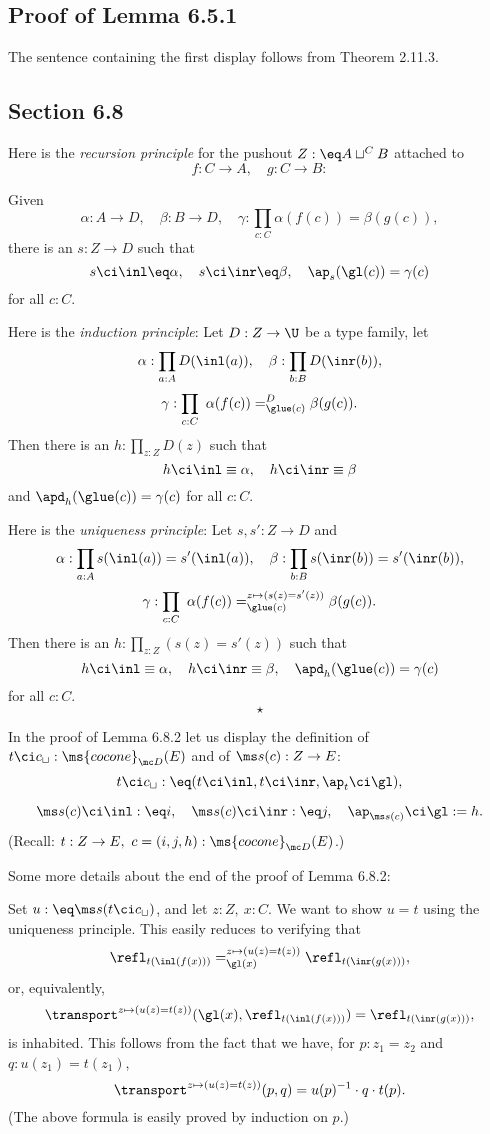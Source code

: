 \documentclass[12pt]{article}
\begin{document}

\subsection{Proof of Lemma 6.5.1}

The sentence containing the first display follows from Theorem 2.11.3.


\subsection{Section 6.8}

Here is the \emph{recursion principle} for the pushout $Z:\eq A\sqcup^CB$ attached to 
$$
f:C\to A,\quad g:C\to B:
$$ 

Given 
$$
\alpha:A\to D,\quad\beta:B\to D,\quad\gamma:\prod_{c:C}\alpha(f(c))=\beta(g(c)),
$$ 
there is an $s:Z\to D$ such that 
$$
s\ci\inl\eq\alpha,\quad s\ci\inr\eq\beta,\quad\ap_s(\gl(c))=\gamma(c)
$$ 
for all $c:C$.

Here is the \emph{induction principle}: Let $D:Z\to\U$ be a type family, let 
$$
\alpha:\prod_{a:A}D(\inl(a)),\quad\beta:\prod_{b:B}D(\inr(b)),
$$
$$
\gamma:\prod_{c:C}\ \alpha(f(c))=^D_{\glue(c)}\beta(g(c)).
$$ 
Then there is an $h:\prod_{z:Z}D(z)$ such that 
$$
h\ci\inl\equiv\alpha,\quad h\ci\inr\equiv\beta
$$ 
and $\apd_h(\glue(c))=\gamma(c)$ for all $c:C$. 

Here is the \emph{uniqueness principle}: Let $s,s':Z\to D$ and 
$$
\alpha:\prod_{a:A}s(\inl(a))=s'(\inl(a)),\quad\beta:\prod_{b:B}s(\inr(b))=s'(\inr(b)),
$$
$$
\gamma:\prod_{c:C}\ \alpha(f(c))=^{z\mapsto(s(z)=s'(z))}_{\glue(c)}\beta(g(c)).
$$ 
Then there is an $h:\prod_{z:Z}(s(z)=s'(z))$ such that 
$$
h\ci\inl\equiv\alpha,\quad h\ci\inr\equiv\beta,\quad\apd_h(\glue(c))=\gamma(c)
$$ 
for all $c:C$. 
$$
\star
$$

In the proof of Lemma 6.8.2 let us display the definition of $t\ci c_{\sqcup}:\ms{cocone}_{\mc D}(E)$ and of $\ms s(c):Z\to E$: 
$$
t\ci c_{\sqcup}:\eq(t\ci\inl,t\ci\inr,\ap_t\ci\gl),
$$ 

$$
\ms s(c)\ci\inl:\eq i,\quad\ms s(c)\ci\inr :\eq j,\quad\ap_{\ms s(c)}\ci\gl:=h.
$$ 
(Recall: $t:Z\to E,\ c=(i,j,h):\ms{cocone}_{\mc D}(E)$.)

Some more details about the end of the proof of Lemma 6.8.2:

Set $u:\eq\ms s(t\ci c_\sqcup)$, and let $z:Z,\ x:C$. We want to show $u=t$ using the uniqueness principle. This easily reduces to verifying that 
$$
\refl_{t(\inl(f(x)))}=_{\gl(x)}^{z\mapsto(u(z)=t(z))}\refl_{t(\inr(g(x)))},
$$ 
or, equivalently, 
$$
\transport^{z\mapsto(u(z)=t(z))}(\gl(x),\refl_{t(\inl(f(x)))})=\refl_{t(\inr(g(x)))},
$$ 
is inhabited. This follows from the fact that we have, for $p:z_1=z_2$ and $q:u(z_1)=t(z_1)$, 
$$
\transport^{z\mapsto(u(z)=t(z))}(p,q)=u(p)^{-1}\cdot q\cdot t(p).
$$ 
(The above formula is easily proved by induction on $p$.)
\end{document}
